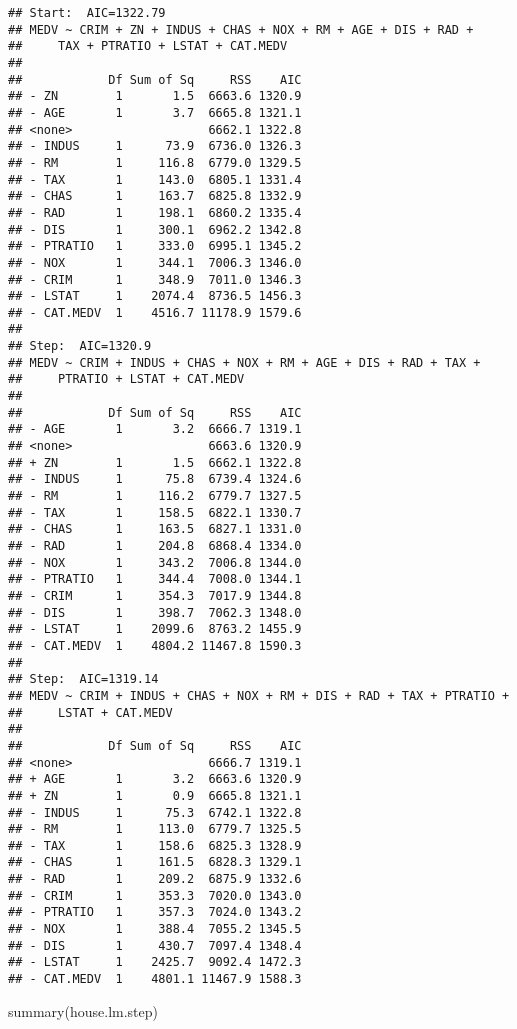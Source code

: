 \documentclass[
]{article}
\newenvironment{Shaded}{\begin{snugshade}}{\end{snugshade}}
\newcommand{\FunctionTok}[1]{\textcolor[rgb]{0.00,0.00,0.00}{#1}}
\newcommand{\NormalTok}[1]{#1}
\begin{document}
\begin{verbatim}
## Start:  AIC=1322.79
## MEDV ~ CRIM + ZN + INDUS + CHAS + NOX + RM + AGE + DIS + RAD + 
##     TAX + PTRATIO + LSTAT + CAT.MEDV
## 
##            Df Sum of Sq     RSS    AIC
## - ZN        1       1.5  6663.6 1320.9
## - AGE       1       3.7  6665.8 1321.1
## <none>                   6662.1 1322.8
## - INDUS     1      73.9  6736.0 1326.3
## - RM        1     116.8  6779.0 1329.5
## - TAX       1     143.0  6805.1 1331.4
## - CHAS      1     163.7  6825.8 1332.9
## - RAD       1     198.1  6860.2 1335.4
## - DIS       1     300.1  6962.2 1342.8
## - PTRATIO   1     333.0  6995.1 1345.2
## - NOX       1     344.1  7006.3 1346.0
## - CRIM      1     348.9  7011.0 1346.3
## - LSTAT     1    2074.4  8736.5 1456.3
## - CAT.MEDV  1    4516.7 11178.9 1579.6
## 
## Step:  AIC=1320.9
## MEDV ~ CRIM + INDUS + CHAS + NOX + RM + AGE + DIS + RAD + TAX + 
##     PTRATIO + LSTAT + CAT.MEDV
## 
##            Df Sum of Sq     RSS    AIC
## - AGE       1       3.2  6666.7 1319.1
## <none>                   6663.6 1320.9
## + ZN        1       1.5  6662.1 1322.8
## - INDUS     1      75.8  6739.4 1324.6
## - RM        1     116.2  6779.7 1327.5
## - TAX       1     158.5  6822.1 1330.7
## - CHAS      1     163.5  6827.1 1331.0
## - RAD       1     204.8  6868.4 1334.0
## - NOX       1     343.2  7006.8 1344.0
## - PTRATIO   1     344.4  7008.0 1344.1
## - CRIM      1     354.3  7017.9 1344.8
## - DIS       1     398.7  7062.3 1348.0
## - LSTAT     1    2099.6  8763.2 1455.9
## - CAT.MEDV  1    4804.2 11467.8 1590.3
## 
## Step:  AIC=1319.14
## MEDV ~ CRIM + INDUS + CHAS + NOX + RM + DIS + RAD + TAX + PTRATIO + 
##     LSTAT + CAT.MEDV
## 
##            Df Sum of Sq     RSS    AIC
## <none>                   6666.7 1319.1
## + AGE       1       3.2  6663.6 1320.9
## + ZN        1       0.9  6665.8 1321.1
## - INDUS     1      75.3  6742.1 1322.8
## - RM        1     113.0  6779.7 1325.5
## - TAX       1     158.6  6825.3 1328.9
## - CHAS      1     161.5  6828.3 1329.1
## - RAD       1     209.2  6875.9 1332.6
## - CRIM      1     353.3  7020.0 1343.0
## - PTRATIO   1     357.3  7024.0 1343.2
## - NOX       1     388.4  7055.2 1345.5
## - DIS       1     430.7  7097.4 1348.4
## - LSTAT     1    2425.7  9092.4 1472.3
## - CAT.MEDV  1    4801.1 11467.9 1588.3
\end{verbatim}

\begin{Shaded}
\begin{Highlighting}[]
\FunctionTok{summary}\NormalTok{(house.lm.step)}
\end{Highlighting}
\end{Shaded}
\end{document}

